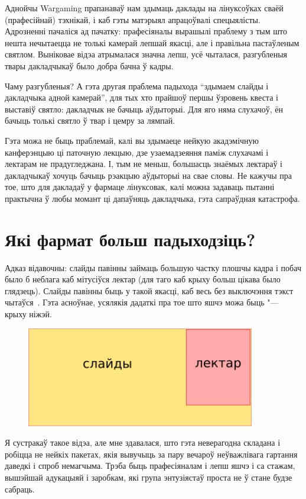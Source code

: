 \documentclass[10pt, a5paper]{article}
\begin{document}
Аднойчы Wargaming прапанаваў нам здымаць даклады на лінуксоўках сваёй (прафесійнай) тэхнікай, і каб гэты матэрыял апрацоўвалі спецыялісты. Адрозненні пачаліся ад пачатку: прафесіяналы вырашылі праблему з тым што нешта нечытаецца не толькі камерай лепшай якасці, але і правільна пастаўленым святлом. Выніковае відэа атрымалася значна лепш, усё чыталася, разгубленыя твары дакладчыкаў было добра бачна ў кадры.

Чаму разгубленыя? А гэта другая праблема падыхода ``здымаем слайды і дакладчыка адной камерай'', для тых хто прайшоў першы ўзровень квеста і выставіў святло: дакладчык не бачыць аўдыторыі. Для яго няма слухачоў, ён бачыць толькі святло ў твар і цемру за лямпай.

Гэта можа не быць праблемай, калі вы здымаеце нейкую акадэмічную канферэнцыю ці паточную лекцыю, дзе узаемадзеяння паміж слухачамі і лектарам не прадугледжана. І, тым не меньш, большасць знаёмых лектараў і дакладчыкаў хочуць бачыць рэакцыю аўдыторыі на свае словы. Не кажучы пра тое, што для дакладаў у фармаце лінуксовак, калі можна задаваць пытанні практычна ў любы момант ці дапаўняць дакладчыка, гэта сапраўдная катастрофа.

\section*{Які фармат больш падыходзіць?}

Адказ відавочны: слайды павінны займаць большую частку \linebreak плошчы кадра і побач было б неблага каб мітусіўся лектар (для таго каб крыху больш цікава было глядзець). Слайды павінны быць у такой якасці, каб весь без выключэння тэкст чытаўся~\cite{Zakharevich2}. Гэта асноўнае, усялякія дадаткі пра тое што яшчэ можа быць "--- крыху ніжэй.

\begin{figure}[h!]
  \centering
  \includegraphics[width=10cm]{32_2016_Zakharevich2.png}
\end{figure}

Я сустракаў такое відэа, але мне здавалася, што гэта неверагодна складана і робіцца не нейкіх пакетах, якія вывучыць за пару вечароў неўважлівага гартання даведкі і спроб немагчыма. Трэба быць прафесіяналам і лепш яшчэ і са стажам, вышэйшай адукацыяй і заробкам, які група энтузіястаў проста не ў стане будзе сабраць.
\end{document}
